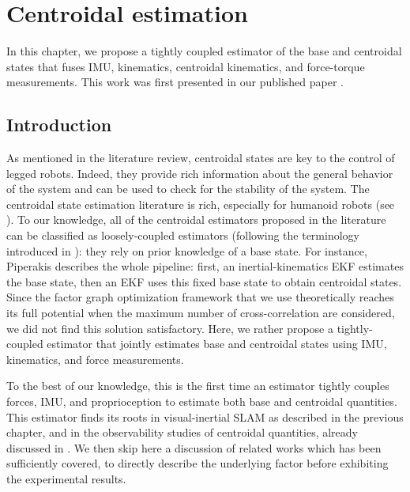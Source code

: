 \chapter{Centroidal estimation}
\label{chp:centroidal_estimation}
\minitoc
\bigskip


In this chapter, we propose a tightly coupled estimator of the base and centroidal states that fuses IMU, kinematics, centroidal kinematics, 
and force-torque measurements. This work was first presented in our published paper \cite{fourmy2021contact}.

\section{Introduction}

As mentioned in the literature review, centroidal states are key to the control of legged robots. Indeed, they provide rich information about the general
behavior of the system and can be used to check for the stability of the system. The centroidal state estimation literature is rich, especially for humanoid
robots (see ). To our knowledge, all of the centroidal estimators proposed in the literature can be classified as loosely-coupled estimators 
(following the terminology introduced in ): they rely on prior knowledge of a base state. For instance, Piperakis \cite{piperakis2018nonlinear} 
describes the whole pipeline: first, an inertial-kinematics EKF estimates the base state, then an EKF uses this fixed base state to obtain centroidal states. 
Since the factor graph optimization framework that we use theoretically reaches its full potential when the maximum number of cross-correlation
are considered, we did not find this solution satisfactory. Here, we rather propose a tightly-coupled estimator that jointly estimates
base and centroidal states using IMU, kinematics, and force measurements.



To the best of our knowledge, this is the first time an estimator tightly couples forces, IMU, and proprioception to estimate both base and centroidal
quantities. This estimator finds its roots in visual-inertial SLAM as described in the previous chapter,
and in the observability studies of centroidal quantities, already discussed in . We then skip here a discussion of related
works which has been sufficiently covered, to directly describe the underlying factor before exhibiting the experimental results.


